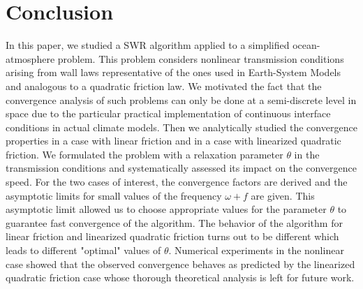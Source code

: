 \section{Conclusion}
In this paper, we studied a SWR %
algorithm applied
to a simplified ocean-atmosphere problem. 
This problem considers nonlinear transmission conditions arising 
from wall laws representative of the ones used in Earth-System Models
and analogous to a quadratic friction law. We 
motivated the fact that the convergence analysis of such 
problems can only be done at a semi-discrete level in space due to the particular practical implementation of continuous interface conditions in actual climate models.  
Then we analytically studied the convergence properties in a
case with linear friction and in a case with linearized 
quadratic friction. We formulated the problem with a 
relaxation parameter $\theta$ in the transmission conditions and 
systematically assessed its impact on the convergence speed. 
%
%
%
%
For the two cases of interest, the convergence factors are derived and 
the asymptotic limits for small values of the frequency $\omega+f$ 
are given. This asymptotic limit allowed us to choose appropriate values
for the parameter $\theta$ to guarantee fast convergence of the algorithm.
%
The behavior of the algorithm for linear friction and linearized 
quadratic friction turns out to be different which leads to different
"optimal" values of $\theta$. 
%
%
Numerical experiments in the nonlinear case showed that the observed 
convergence behaves as predicted by the linearized quadratic friction
case whose thorough theoretical analysis is left for future work.

